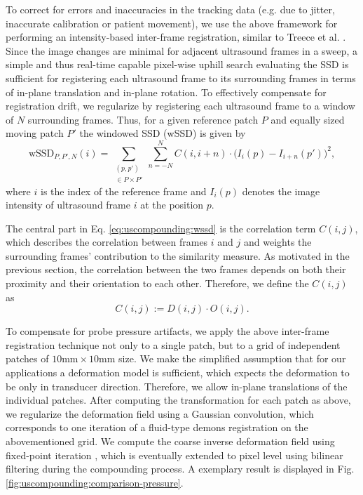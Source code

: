 To correct for errors and inaccuracies in the tracking data (e.g. due to jitter, inaccurate calibration or patient movement), we use the above framework for performing an intensity-based inter-frame registration, similar to Treece et al. \cite{Treece02}.
Since the image changes are minimal for adjacent ultrasound frames in a sweep, a simple and thus real-time capable pixel-wise uphill search evaluating the SSD is sufficient for registering each ultrasound frame to its surrounding frames in terms of in-plane translation and in-plane rotation.
To effectively compensate for registration drift, we regularize  by registering each ultrasound frame to a window of $N$ surrounding frames.
Thus, for a given reference patch $P$ and equally sized moving patch $P'$ the windowed SSD (wSSD) is given by
\begin{equation}
	\label{eq:uscompounding:wssd}
	\text{wSSD}_{P, P', N} (i) = \sum_{
		\substack{(p, p') \\ \in P \times P'}
	} \sum_{n = -N}^{N}  C(i, i+n) \cdot \big( I_i(p) - I_{i+n}(p') \big)^2,
\end{equation}
where $i$ is the index of the reference frame and $I_i(p)$ denotes the image intensity of ultrasound frame $i$ at the position $p$.


The central part in Eq. \ref{eq:uscompounding:wssd} is the correlation term $C(i, j)$, which describes the correlation between frames $i$ and $j$ and weights the surrounding frames' contribution to the similarity measure.
As motivated in the previous section, the correlation between the two frames depends on both their proximity and their orientation to each other.
Therefore, we define the $C(i, j)$ as
\begin{equation}
	\label{eq:uscompounding:correlation-term}
	C(i,j) := D(i,j) \cdot O(i,j).
\end{equation}

To compensate for probe pressure artifacts, we apply the above inter-frame registration technique not only to a single patch, but to a grid of independent patches of $10\text{mm} \times 10\text{mm}$ size.
We make the simplified assumption that for our applications a deformation model is sufficient, which expects the deformation to be only in transducer direction. 
Therefore, we allow in-plane translations of the individual patches.
After computing the transformation for each patch as above, we regularize the deformation field using a Gaussian  convolution, which corresponds to one iteration of a fluid-type demons registration \cite{Nielsen96,Thirion98,Zikic11} on the abovementioned grid.
We compute the coarse inverse deformation field using fixed-point iteration \cite{Chen08}, which is eventually extended to pixel level using bilinear filtering during the compounding process.
A exemplary result is displayed in Fig. \ref{fig:uscompounding:comparison-pressure}.



